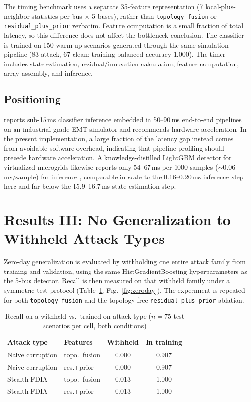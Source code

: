 \documentclass[conference]{IEEEtran}
\begin{document}
The timing benchmark uses a separate 35-feature representation (7 local-plus-neighbor statistics per bus $\times$ 5 buses), rather than \texttt{topology\_fusion} or \texttt{residual\_plus\_prior} verbatim. Feature computation is a small fraction of total latency, so this difference does not affect the bottleneck conclusion. The classifier is trained on 150 warm-up scenarios generated through the same simulation pipeline (83 attack, 67 clean; training balanced accuracy 1.000). The timer includes state estimation, residual/innovation calculation, feature computation, array assembly, and inference.

\subsection{Positioning}
\cite{abukhousa2026latency} reports sub-15\,ms classifier inference embedded in 50--90\,ms end-to-end pipelines on an industrial-grade EMT simulator and recommends hardware acceleration. In the present implementation, a large fraction of the latency gap instead comes from avoidable software overhead, indicating that pipeline profiling should precede hardware acceleration. A knowledge-distilled LightGBM detector for virtualized microgrids likewise reports only 54--67\,ms per 1000 samples ($\sim$0.06\,ms/sample) for inference \cite{ogiesoba2026cyberattack}, comparable in scale to the 0.16--0.20\,ms inference step here and far below the 15.9--16.7\,ms state-estimation step.

\section{Results III: No Generalization to Withheld Attack Types}
\label{sec:zeroday}

Zero-day generalization is evaluated by withholding one entire attack family from training and validation, using the same HistGradientBoosting hyperparameters as the 5-bus detector. Recall is then measured on that withheld family under a symmetric test protocol (Table~\ref{tab:zeroday}, Fig.~\ref{fig:zeroday}). The experiment is repeated for both \texttt{topology\_fusion} and the topology-free \texttt{residual\_plus\_prior} ablation.

\begin{table}[t]
\centering
\caption{Recall on a withheld vs.\ trained-on attack type ($n{=}75$ test scenarios per cell, both conditions)}
\label{tab:zeroday}
\footnotesize
\begin{tabular}{@{}llcc@{}}
\toprule
Attack type & Features & Withheld & In training \\
\midrule
Naive corruption & topo.\ fusion & 0.000 & 0.907 \\
Naive corruption & res.+prior & 0.000 & 0.907 \\
Stealth FDIA & topo.\ fusion & 0.013 & 1.000 \\
Stealth FDIA & res.+prior & 0.013 & 1.000 \\
\bottomrule
\end{tabular}
\end{table}
\end{document}
